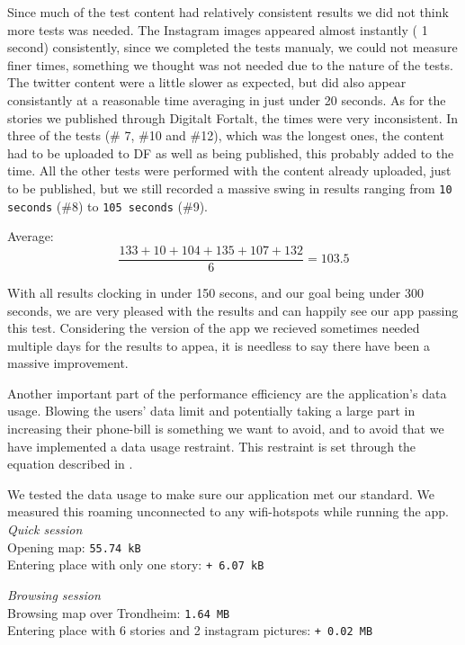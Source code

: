 Since much of the test content had relatively consistent results we did not think more tests was needed. The Instagram images appeared almost instantly ( 1 second) consistently, since we completed the tests manualy, we could not measure finer times, something we thought was not needed due to the nature of the tests. The twitter content were a little slower as expected, but did also appear consistantly at a reasonable time averaging in just under 20 seconds. As for the stories we published through Digitalt Fortalt, the times were very inconsistent. In three of the tests (\# 7, \#10 and \#12), which was the longest ones, the content had to be uploaded to DF as well as being published, this probably added to the time. All the other tests were performed with the content already uploaded, just to be published, but we still recorded a massive swing in results ranging from \texttt{10 seconds} (\#8) to \texttt{105 seconds} (\#9).


Average: 
\begin{equation}
\frac{133 + 10 + 104 + 135 + 107 + 132}{6} = {103.5}
\end{equation}

With all results clocking in under 150 secons, and our goal being under 300 seconds, we are very pleased with the results and can happily see our app passing this test. Considering the version of the app we recieved sometimes needed multiple days for the results to appea, it is needless to say there have been a massive improvement.


Another important part of the performance efficiency are the application's data usage. Blowing the users' data limit and potentially taking a large part in increasing their phone-bill is something we want to avoid, and to avoid that we have implemented a data usage restraint. This restraint is set through the equation described in .

We tested the data usage to make sure our application met our standard. We measured this roaming unconnected to any wifi-hotspots while running the app.\\

\emph{Quick session}\\
Opening map: \texttt{55.74 kB}\\
Entering place with only one story: \texttt{+ 6.07 kB}

\emph{Browsing session}\\
Browsing map over Trondheim: \texttt{1.64 MB}\\
Entering place with 6 stories and 2 instagram pictures: \texttt{+ 0.02 MB}

